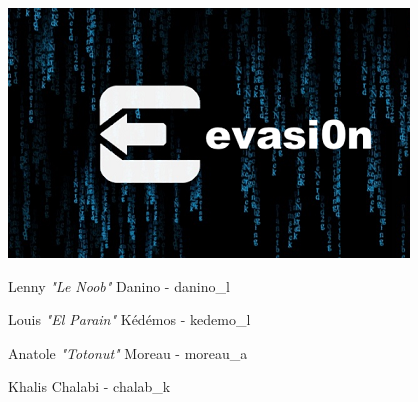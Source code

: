 \documentclass{article}
\begin{document}
\thispagestyle{empty}
\begin{center}
\end{center}

\vspace*{0.7cm}

\begin{center}
\end{center}

\vspace*{0.5cm}

\begin{center}
\includegraphics[scale=01.0]{evasion}
\end{center}

\vspace*{0.5cm}

\fontsize{14}{14}
\begin{center}
{Lenny \textcolor{pseudorouge}{\textit{"Le Noob"}} Danino - danino\_l}
\end{center}
\begin{center}
Louis \textcolor{pseudoblue}{\textit{"El Parain"}} Kédémos - kedemo\_l
\end{center}
\begin{center}
 Anatole \textcolor{pseudoblue}{\textit{"Totonut"}} Moreau - moreau\_a
\end{center}
\begin{center}
Khalis Chalabi - chalab\_k
\end{center}
\end{document}
